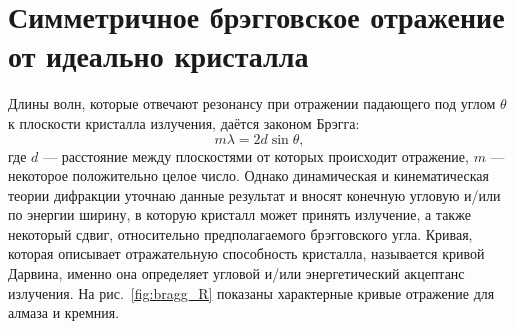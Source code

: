 \section{Симметричное брэгговское отражение от идеально кристалла}\label{diamond cry absorb}
Длины волн, которые отвечают резонансу при отражении падающего под углом $\theta$ к плоскости кристалла излучения, даётся законом Брэгга:  
\begin{equation}
	m\lambda = 2d\sin\theta,
\end{equation}
где $d$ --- расстояние между плоскостями от которых происходит отражение, $m$ --- некоторое положительно целое число. Однако динамическая и кинематическая теории дифракции уточнаю данные результат и вносят конечную угловую и/или по энергии ширину, в которую кристалл может принять излучение, а также некоторый сдвиг, относительно предполагаемого брэгговского угла.  Кривая, которая описывает отражательную способность кристалла, называется кривой Дарвина, именно она определяет угловой и/или энергетический акцептанс излучения. На рис.~\ref{fig:bragg_R} показаны характерные кривые отражение для алмаза и кремния. 
